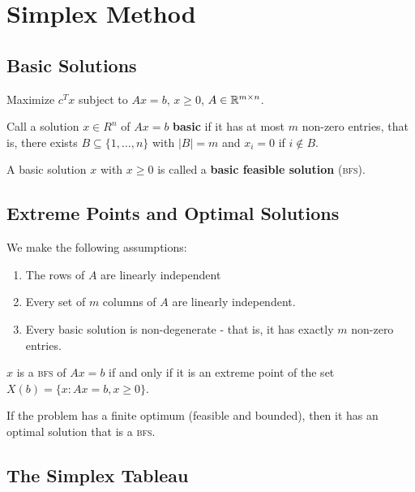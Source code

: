 \chapter{Simplex Method}
\label{cha:simplex-method}

\section{Basic Solutions}
\label{sec:basic-solutions}

Maximize $c^{T}x$ subject to $Ax = b$, $x \geq 0$, $A \in \mathbb{R}^{m \times
n}$.

Call a solution $x \in R^{n}$ of $Ax = b$ \textbf{basic} if it has at
most $m$ non-zero entries, that is, there exists $B \subseteq \{1, \dots, n
\}$ with $|B| = m$ and $x_{i} = 0$ if $i \notin B$.

\newcommand{\bfs}{\textsc{bfs}\xspace}
A basic solution $x$ with $x \geq 0$ is called a \textbf{basic
  feasible solution} (\bfs).

\section{Extreme Points and Optimal Solutions}
\label{sec:extr-points-optim}

We make the following assumptions:

\begin{enumerate}
\item The rows of $A$ are linearly independent
\item Every set of $m$ columns of $A$ are linearly independent.
\item Every basic solution is non-degenerate - that is, it has exactly
  $m$ non-zero entries.
\end{enumerate}

\begin{thm}
  \label{defn:simplex_method:1}
  $x$ is a \bfs of $Ax = b$ if and only if it is an extreme point of
  the set  $X(b) = \{ x: Ax = b, x \geq 0 \}$.
\end{thm}

\begin{thm}
  \label{defn:simplex_method:2}
  If the problem has a finite optimum (feasible and bounded), then it has an optimal solution
  that is a \bfs.
\end{thm}


\section{The Simplex Tableau}
\label{sec:simplex-tableau}

